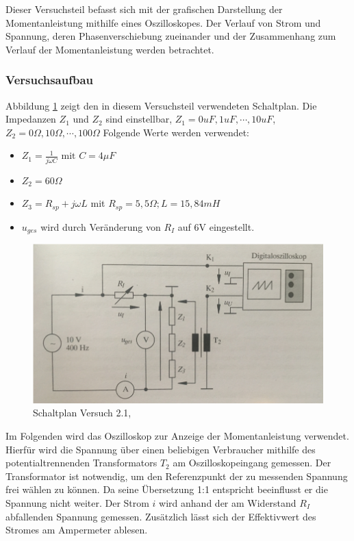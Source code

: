 \label{sec:Versuch2.2.1}
Dieser Versuchsteil befasst sich mit der grafischen Darstellung der Momentanleistung mithilfe eines Oszilloskopes. Der Verlauf von Strom und Spannung, deren Phasenverschiebung zueinander und der Zusammenhang zum Verlauf der Momentanleistung werden betrachtet.


\subsubsection{Versuchsaufbau}
\label{sec:Aufbau2.2.1}

Abbildung \ref{fig:Plan2-1} zeigt den in diesem Versuchsteil verwendeten Schaltplan. Die Impedanzen $Z_1$ und $Z_2$ sind einstellbar, $Z_1 = 0uF, 1uF, \cdots, 10uF$, $Z_2 =  0\Omega, 10\Omega, \cdots, 100\Omega$ Folgende Werte werden verwendet:
\begin{itemize}
\item $Z_1 = \frac{1}{j\omega C} \mbox{ mit } C=4\mu F$
\item $Z_2 = 60\Omega$
\item $Z_3 = R_{sp} + j\omega L$ mit $R_{sp} = 5,5\Omega; L=15,84mH$
\item $u_{ges}$ wird durch Veränderung von $R_I$ auf 6V eingestellt.
\end{itemize}

\begin{figure}[h]
\centering
\includegraphics[width=0.7\linewidth]{Images/Aufbau2-1.png}
\caption{Schaltplan Versuch 2.1, \cite[47]{GEMLBuch}}
\label{fig:Plan2-1}
\end{figure}

Im Folgenden wird das Oszilloskop zur Anzeige der Momentanleistung verwendet. Hierfür wird die Spannung über einen beliebigen Verbraucher mithilfe des potentialtrennenden Transformators $T_2$ am Oszilloskopeingang gemessen. Der Transformator ist notwendig, um den Referenzpunkt der zu messenden Spannung frei wählen zu können. Da seine Übersetzung 1:1 entspricht beeinflusst er die Spannung nicht weiter. Der Strom $i$ wird anhand der am Widerstand $R_I$ abfallenden Spannung gemessen. Zusätzlich lässt sich der Effektivwert des Stromes am Ampermeter ablesen.

